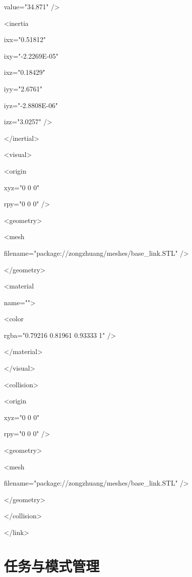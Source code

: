         value="34.871" /\textgreater{}

      \textless inertia

        ixx="0.51812"

        ixy="-2.2269E-05"

        ixz="0.18429"

        iyy="2.6761"

        iyz="-2.8808E-06"

        izz="3.0257" /\textgreater{}

    \textless/inertial\textgreater{}

    \textless visual\textgreater{}

      \textless origin

        xyz="0 0 0"

        rpy="0 0 0" /\textgreater{}

      \textless geometry\textgreater{}

        \textless mesh

          filename="package://zongzhuang/meshes/base\_link.STL" /\textgreater{}

      \textless/geometry\textgreater{}

      \textless material

        name=""\textgreater{}

        \textless color

          rgba="0.79216 0.81961 0.93333 1" /\textgreater{}

      \textless/material\textgreater{}

    \textless/visual\textgreater{}

    \textless collision\textgreater{}

      \textless origin

        xyz="0 0 0"

        rpy="0 0 0" /\textgreater{}

      \textless geometry\textgreater{}

        \textless mesh

          filename="package://zongzhuang/meshes/base\_link.STL" /\textgreater{}

      \textless/geometry\textgreater{}

    \textless/collision\textgreater{}

  \textless/link\textgreater{}

\section{任务与模式管理}


